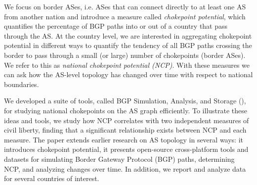 We focus on border ASes, i.e. ASes that can connect directly to at least
one AS from another nation and introduce a measure called \emph{chokepoint potential}, which quantifies the percentage of BGP paths into or out of a country that pass through the AS.  At the country level, we are interested in aggregating chokepoint potential in different ways to quantify the tendency of all BGP paths crossing the border to pass through a small (or large) number of chokepoints (border ASes). We  refer to this as \emph{national chokepoint potential (NCP)}.
With these measures 
we can ask how the AS-level topology has changed over time with respect
to national boundaries. 

We developed a
suite of tools, called BGP Simulation, Analysis, and Storage (\toolname{}), for studying national 
chokepoints on
the AS graph efficiently. To illustrate these ideas and tools, we
study how NCP correlates with two independent
measures of civil liberty, finding that a significant relationship exists between NCP and each measure.
The paper extends earlier research on AS topology in several ways: it introduces chokepoint potential, it presents open-source cross-platform tools and datasets for simulating Border Gateway Protocol (BGP) paths,
determining NCP, and analyzing changes over time.  In addition, we report and analyze data for several countries of interest.


